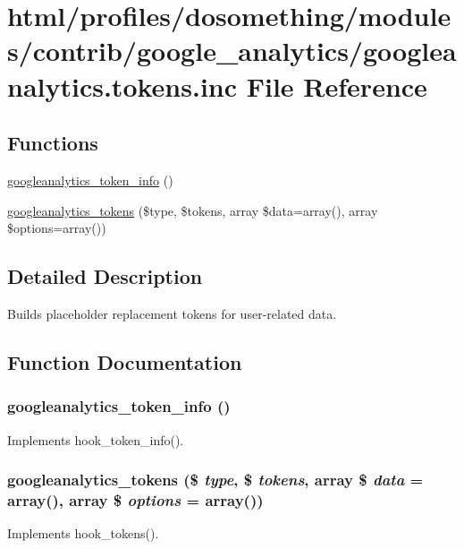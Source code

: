 \hypertarget{googleanalytics_8tokens_8inc}{
\section{html/profiles/dosomething/modules/contrib/google\_\-analytics/googleanalytics.tokens.inc File Reference}
\label{googleanalytics_8tokens_8inc}
}
\subsection*{Functions}
\begin{DoxyCompactItemize}
\item 
\hyperlink{googleanalytics_8tokens_8inc_a41f3ed09246b0dd2e51f1e41d604af24}{googleanalytics\_\-token\_\-info} ()
\item 
\hyperlink{googleanalytics_8tokens_8inc_a7ab13afdbf75bfe40bce385f6cfeed87}{googleanalytics\_\-tokens} (\$type, \$tokens, array \$data=array(), array \$options=array())
\end{DoxyCompactItemize}


\subsection{Detailed Description}
Builds placeholder replacement tokens for user-\/related data. 

\subsection{Function Documentation}
\hypertarget{googleanalytics_8tokens_8inc_a41f3ed09246b0dd2e51f1e41d604af24}{
\subsubsection[{googleanalytics\_\-token\_\-info}]{\setlength{\rightskip}{0pt plus 5cm}googleanalytics\_\-token\_\-info ()}}
\label{googleanalytics_8tokens_8inc_a41f3ed09246b0dd2e51f1e41d604af24}
Implements hook\_\-token\_\-info(). \hypertarget{googleanalytics_8tokens_8inc_a7ab13afdbf75bfe40bce385f6cfeed87}{
\subsubsection[{googleanalytics\_\-tokens}]{\setlength{\rightskip}{0pt plus 5cm}googleanalytics\_\-tokens (\$ {\em type}, \/  \$ {\em tokens}, \/  array \$ {\em data} = {\ttfamily array()}, \/  array \$ {\em options} = {\ttfamily array()})}}
\label{googleanalytics_8tokens_8inc_a7ab13afdbf75bfe40bce385f6cfeed87}
Implements hook\_\-tokens(). 